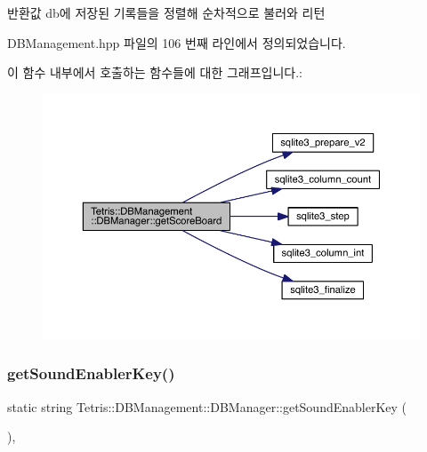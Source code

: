 \begin{DoxyReturn}{반환값}
db에 저장된 기록들을 정렬해 순차적으로 불러와 리턴 
\end{DoxyReturn}


D\+B\+Management.\+hpp 파일의 106 번째 라인에서 정의되었습니다.

이 함수 내부에서 호출하는 함수들에 대한 그래프입니다.\+:
\nopagebreak
\begin{figure}[H]
\begin{center}
\leavevmode
\includegraphics[width=350pt]{class_tetris_1_1_d_b_management_1_1_d_b_manager_aa67ef286408b2631e15e9f8f41937c97_cgraph}
\end{center}
\end{figure}
\mbox{\label{class_tetris_1_1_d_b_management_1_1_d_b_manager_ae8c98091466565c4c70971e6b7a42ce6}} 
\subsubsection{\texorpdfstring{get\+Sound\+Enabler\+Key()}{getSoundEnablerKey()}}
{\footnotesize\ttfamily static string Tetris\+::\+D\+B\+Management\+::\+D\+B\+Manager\+::get\+Sound\+Enabler\+Key (\begin{DoxyParamCaption}{ }\end{DoxyParamCaption})\hspace{0.3cm}{\ttfamily [inline]}, {\ttfamily [static]}}



